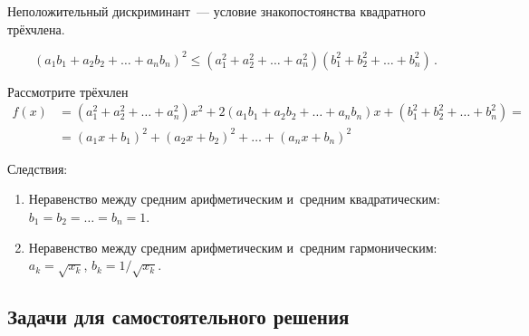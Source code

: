


\begingroup
    \def\abs#1{\lvert #1 \rvert}%

Неположительный дискриминант~--- условие знакопостоянства квадратного
трёхчлена.

\[
    (a_{1} b_{1} + a_{2} b_{2} + \ldots + a_{n} b_{n})^2
\leq
    (a_{1}^2 + a_{2}^2 + \ldots + a_{n}^2)
    (b_{1}^2 + b_{2}^2 + \ldots + b_{n}^2)
\, . \]

Рассмотрите трёхчлен
\begin{align*}
    f(x)
& =
    (a_{1}^2 + a_{2}^2 + \ldots + a_{n}^2) x^2
    +
    2 (a_{1} b_{1} + a_{2} b_{2} + \ldots + a_{n} b_{n}) x
    +
    (b_{1}^2 + b_{2}^2 + \ldots + b_{n}^2)
= \\ & =
    (a_{1} x + b_{1})^2 + (a_{2} x + b_{2})^2 + \ldots + (a_{n} x + b_{n})^2
\end{align*}

Следствия:
\begin{enumerate}
\item
Неравенство между средним арифметическим и~средним квадратическим:\\
$b_{1} = b_{2} = \ldots = b_{n} = 1$.
\item
Неравенство между средним арифметическим и~средним гармоническим:\\
$a_{k} = \sqrt{x_{k}}$, $b_{k} = 1 / \sqrt{x_{k}}$.
\end{enumerate}


\subsection*{Задачи для самостоятельного решения}

